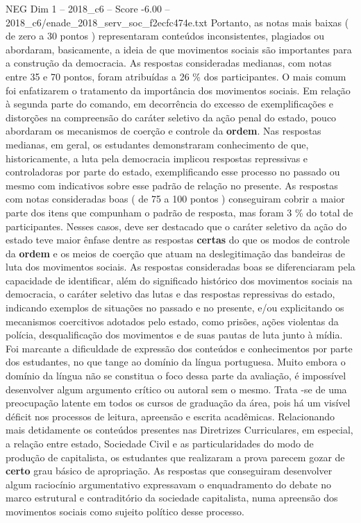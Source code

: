 \begin{textsample}{NEG Dim 1 – 2018\_c6 – Score -6.00 – 2018\_c6/enade\_2018\_serv\_soc\_f2ecfc474e.txt}
Portanto, as notas mais baixas ( de zero a 30 pontos ) representaram conteúdos inconsistentes, plagiados ou abordaram, basicamente, a ideia de que movimentos sociais são importantes para a construção da democracia.
As respostas consideradas medianas, com notas entre 35 e 70 pontos, foram atribuídas a 26 \% dos participantes.
O mais comum foi enfatizarem o tratamento da importância dos movimentos sociais.
Em relação à segunda parte do comando, em decorrência do excesso de exemplificações e distorções na compreensão do caráter seletivo da ação penal do estado, pouco abordaram os mecanismos de coerção e controle da \textbf{ordem}.
Nas respostas medianas, em geral, os estudantes demonstraram conhecimento de que, historicamente, a luta pela democracia implicou respostas repressivas e controladoras por parte do estado, exemplificando esse processo no passado ou mesmo com indicativos sobre esse padrão de relação no presente.
As respostas com notas consideradas boas ( de 75 a 100 pontos ) conseguiram cobrir a maior parte dos itens que compunham o padrão de resposta, mas foram 3 \% do total de participantes.
Nesses casos, deve ser destacado que o caráter seletivo da ação do estado teve maior ênfase dentre as respostas \textbf{certas} do que os modos de controle da \textbf{ordem} e os meios de coerção que atuam na deslegitimação das bandeiras de luta dos movimentos sociais.
As respostas consideradas boas se diferenciaram pela capacidade de identificar, além do significado histórico dos movimentos sociais na democracia, o caráter seletivo das lutas e das respostas repressivas do estado, indicando exemplos de situações no passado e no presente, e/ou explicitando os mecanismos coercitivos adotados pelo estado, como prisões, ações violentas da polícia, desqualificação dos movimentos e de suas pautas de luta junto à mídia.
Foi marcante a dificuldade de expressão dos conteúdos e conhecimentos por parte dos estudantes, no que tange ao domínio da língua portuguesa.
Muito embora o domínio da língua não se constitua o foco dessa parte da avaliação, é impossível desenvolver algum argumento crítico ou autoral sem o mesmo.
Trata -se de uma preocupação latente em todos os cursos de graduação da área, pois há um visível déficit nos processos de leitura, apreensão e escrita acadêmicas.
Relacionando mais detidamente os conteúdos presentes nas Diretrizes Curriculares, em especial, a relação entre estado, Sociedade Civil e as particularidades do modo de produção de capitalista, os estudantes que realizaram a prova parecem gozar de \textbf{certo} grau básico de apropriação.
As respostas que conseguiram desenvolver algum raciocínio argumentativo expressavam o enquadramento do debate no marco estrutural e contraditório da sociedade capitalista, numa apreensão dos movimentos sociais como sujeito político desse processo.

\end{textsample}
